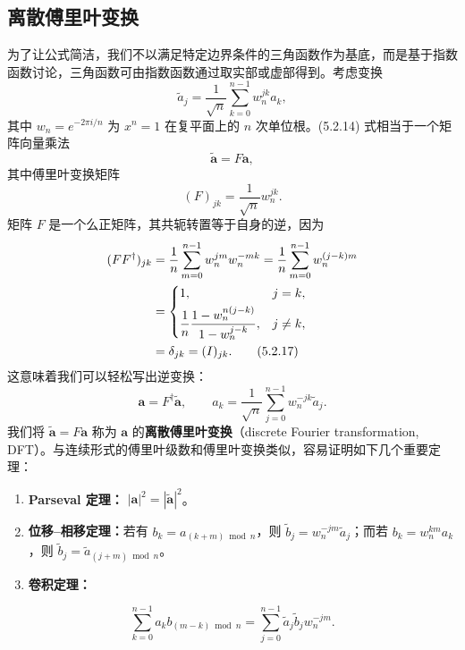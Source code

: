 \subsection{离散傅里叶变换}

为了让公式简洁，我们不以满足特定边界条件的三角函数作为基底，而是基于指数函数讨论，三角函数可由指数函数通过取实部或虚部得到。考虑变换
\begin{equation}
\tilde a_j=\frac1{\sqrt n}\sum_{k=0}^{n-1}w_n^{jk}a_k,
\tag{5.2.14}
\end{equation}
其中 $w_n=e^{-2\pi i/n}$ 为 $x^n=1$ 在复平面上的 $n$ 次单位根。(5.2.14) 式相当于一个矩阵向量乘法
\begin{equation}
\tilde{\bm a}=F\bm a,
\tag{5.2.15}
\end{equation}
其中傅里叶变换矩阵
\begin{equation}
(F)_{jk}=\frac1{\sqrt n}w_n^{jk}.
\tag{5.2.16}
\end{equation}
矩阵 $F$ 是一个么正矩阵，其共轭转置等于自身的逆，因为
\begin{align}
(FF^\dagger)_{jk}
&=\frac1n\sum_{m=0}^{n-1}w_n^{jm}w_n^{-mk}
=\frac1n\sum_{m=0}^{n-1}w_n^{(j-k)m}\notag\\
&=\begin{cases}
1,&j=k,\\[3pt]
\dfrac1n\dfrac{1-w_n^{n(j-k)}}{1-w_n^{j-k}},&j\ne k,
\end{cases}\notag\\
&=\delta_{jk}=(I)_{jk}.
\tag{5.2.17}
\end{align}
这意味着我们可以轻松写出逆变换：
\begin{equation}
\bm a=F^\dagger\tilde{\bm a},\qquad
a_k=\frac1{\sqrt n}\sum_{j=0}^{n-1}w_n^{-jk}\tilde a_j.
\tag{5.2.18}
\end{equation}
我们将 $\tilde{\bm a}=F\bm a$ 称为 $\bm a$ 的\textbf{离散傅里叶变换}（discrete Fourier transformation, DFT）。与连续形式的傅里叶级数和傅里叶变换类似，容易证明如下几个重要定理：
\begin{enumerate}[label=(\arabic*)]
\item \textbf{Parseval 定理：} $|\bm a|^2=|\tilde{\bm a}|^2$。
\item \textbf{位移--相移定理：}若有 $b_k=a_{(k+m)\bmod n}$，则 $\tilde b_j=w_n^{-jm}\tilde a_j$；而若 $b_k=w_n^{km}a_k$，则 $\tilde b_j=\tilde a_{(j+m)\bmod n}$。
\item \textbf{卷积定理：}
\end{enumerate}
\begin{equation}
\sum_{k=0}^{n-1}a_k b_{(m-k)\bmod n}
=\sum_{j=0}^{n-1}\tilde a_j\tilde b_j w_n^{-jm}.
\tag{5.2.19}
\end{equation}

